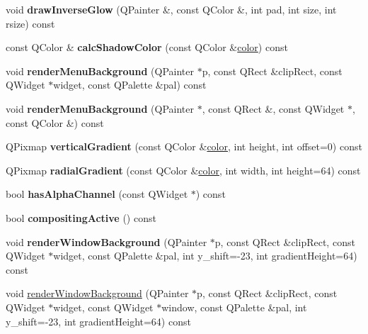 \begin{DoxyCompactItemize}
void {\bfseries draw\+Inverse\+Glow} (Q\+Painter \&, const Q\+Color \&, int pad, int size, int rsize) const
\item 
\mbox{\label{class_style_helper_a517e8873a960716bdc7bb9acc3b745dc}} 
const Q\+Color \& {\bfseries calc\+Shadow\+Color} (const Q\+Color \&\hyperlink{structcolor}{color}) const
\item 
\mbox{\label{class_style_helper_ad83fb0f0a00b02d07749dbeb6cdc7cec}} 
void {\bfseries render\+Menu\+Background} (Q\+Painter $\ast$p, const Q\+Rect \&clip\+Rect, const Q\+Widget $\ast$widget, const Q\+Palette \&pal) const
\item 
\mbox{\label{class_style_helper_a92a288ccd02015dc58ddd75fdf0dc78b}} 
void {\bfseries render\+Menu\+Background} (Q\+Painter $\ast$, const Q\+Rect \&, const Q\+Widget $\ast$, const Q\+Color \&) const
\item 
\mbox{\label{class_style_helper_acb991d1c18118fe2b32af4f95d13043d}} 
Q\+Pixmap {\bfseries vertical\+Gradient} (const Q\+Color \&\hyperlink{structcolor}{color}, int height, int offset=0) const
\item 
\mbox{\label{class_style_helper_abfdf122efc95ad90df592d99289da4cf}} 
Q\+Pixmap {\bfseries radial\+Gradient} (const Q\+Color \&\hyperlink{structcolor}{color}, int width, int height=64) const
\item 
\mbox{\label{class_style_helper_adae020815e0961afb2db92c14e30ed7c}} 
bool {\bfseries has\+Alpha\+Channel} (const Q\+Widget $\ast$) const
\item 
\mbox{\label{class_style_helper_ac224a0528bbc714e46632a9cb115731f}} 
bool {\bfseries compositing\+Active} () const
\item 
\mbox{\label{class_style_helper_a10490b649bbc8bc99a1c783b7ef469a9}} 
void {\bfseries render\+Window\+Background} (Q\+Painter $\ast$p, const Q\+Rect \&clip\+Rect, const Q\+Widget $\ast$widget, const Q\+Palette \&pal, int y\+\_\+shift=-\/23, int gradient\+Height=64) const
\item 
void \hyperlink{class_style_helper_abcce38b9da53408df8d2e8672ec2d84a}{render\+Window\+Background} (Q\+Painter $\ast$p, const Q\+Rect \&clip\+Rect, const Q\+Widget $\ast$widget, const Q\+Widget $\ast$window, const Q\+Palette \&pal, int y\+\_\+shift=-\/23, int gradient\+Height=64) const

\end{DoxyCompactItemize}
